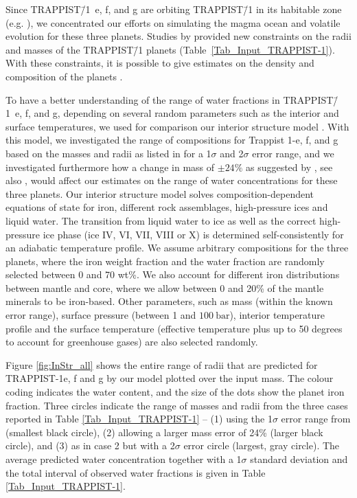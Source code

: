 \documentclass[paper=letterpaper,fontsize=12pt,oneside,twocolumn]{article}
\newcommand{\eg}{e.g. }
\begin{document}
Since TRAPPIST\=/1~e, f, and g are orbiting TRAPPIST\=/1 in its habitable zone (\eg \citet{Kasting1993,Abe2011,Kopparapu2014,Catling2018,Turbet2018,Chen2019}), we concentrated our efforts on simulating the magma ocean and volatile evolution for these three planets. Studies by \citet{Grimm2018} provided new constraints on the radii and masses of the TRAPPIST\=/1 planets (Table~\ref{Tab_Input_TRAPPIST-1}). With these constraints, it is possible to give estimates on the density and composition of the planets \citep{Dorn2018,Unterborn2018b,barr2018interior}. 

To have a better understanding of the range of water fractions in TRAPPIST\=/1~e, f, and g, depending on several random parameters such as the interior and surface temperatures, we used for comparison our interior structure model \citep{Noack2016}. With this model, we investigated the range of compositions for Trappist 1-e, f, and g based on the masses and radii as listed in \citet{Grimm2018} for a 1$\sigma$ and 2$\sigma$ error range, and we investigated furthermore how a change in mass of $\pm24\%$ as suggested by \citet{Demory2018Trappist}, see also \citet{Dorn2018}, would affect our estimates on the range of water concentrations for these three planets.
Our interior structure model solves composition-dependent equations of state for iron, different rock assemblages, high-pressure ices and liquid water. The transition from liquid water to ice as well as the correct high-pressure ice phase (ice IV, VI, VII, VIII or X) is determined self-consistently for an adiabatic temperature profile. We assume arbitrary compositions for the three planets, where the iron weight fraction and the water fraction are randomly selected between 0 and 70 wt\%. We also account for different iron distributions between mantle and core, where we allow between 0 and 20\% of the mantle minerals to be iron-based. Other parameters, such as mass (within the known error range), surface pressure (between 1 and $\SI{100}{\bar}$), interior temperature profile and the surface temperature (effective temperature plus up to 50 degrees to account for greenhouse gases) are also selected randomly.

Figure \ref{fig:InStr_all} shows the entire range of radii that are predicted for TRAPPIST-1e, f and g by our model plotted over the input mass. The colour coding indicates the water content, and the size of the dots show the planet iron fraction. Three circles indicate the range of masses and radii from the three cases reported in Table \ref{Tab_Input_TRAPPIST-1} -- (1) using the 1$\sigma$ error range from \citet{Grimm2018} (smallest black circle), (2) allowing a larger mass error of 24\% (larger black circle), and (3) as in case 2 but with a 2$\sigma$ error circle (largest, gray circle). The average predicted water concentration together with a 1$\sigma$ standard deviation and the total interval of observed water fractions is given in Table \ref{Tab_Input_TRAPPIST-1}.
\end{document}
